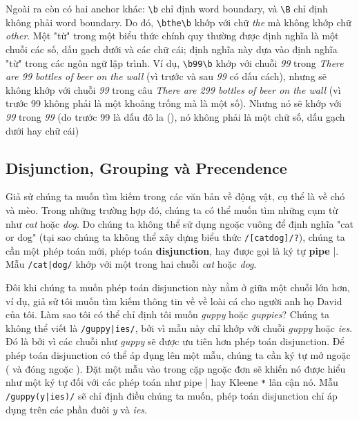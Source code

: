 Ngoài ra còn có hai anchor khác: \verb|\b| chỉ định word boundary, và \verb|\B| chỉ định không phải word boundary. Do đó, \verb|\bthe\b| khớp với chữ \textit{the} mà không khớp chữ \textit{other}. Một "từ" trong một biểu thức chính quy thường được định nghĩa là một chuỗi các số, dấu gạch dưới và các chữ cái; định nghĩa này dựa vào định nghĩa "từ" trong các ngôn ngữ lập trình. Ví dụ, \verb|\b99\b| khớp với chuỗi \textit{99} trong \textit{There are 99 bottles of beer on the wall} (vì trước và sau \textit{99} có dấu cách), nhưng sẽ không khớp với chuỗi \textit{99} trong câu \textit{There are 299 bottles of beer on the wall} (vì trước 99 không phải là một khoảng trống mà là một số). Nhưng nó sẽ khớp với \textit{99} trong \textit{99} (do trước 99 là dấu đô la (), nó không phải là một chữ số, dấu gạch dưới hay chữ cái)

\subsection{Disjunction, Grouping và Precendence}

Giả sử chúng ta muốn tìm kiếm trong các văn bản về động vật, cụ thể là về chó và mèo. Trong những trường hợp đó, chúng ta có thể muốn tìm những cụm từ như \textit{cat} hoặc \textit{dog}. Do chúng ta không thể sử dụng ngoặc vuông để định nghĩa "cat or dog" (tại sao chúng ta không thể xây dựng biểu thức \verb|/[catdog]/?|), chúng ta cần một phép toán mới, phép toán \textbf{disjunction}, hay được gọi là ký tự \textbf{pipe} \verb|||. Mẫu \verb=/cat|dog/= khớp với một trong hai chuỗi \textit{cat} hoặc \textit{dog}.

Đôi khi chúng ta muốn phép toán disjunction này nằm ở giữa một chuỗi lớn hơn, ví dụ, giả sử tôi muốn tìm kiếm thông tin về về loài cá cho người anh họ David của tôi. Làm sao tôi có thể chỉ định tôi muốn \textit{guppy} hoặc \textit{guppies}? Chúng ta không thể viết là \texttt{/guppy|ies/}, bởi vì mẫu này chỉ khớp với chuỗi \textit{guppy} hoặc \textit{ies}. Đó là bởi vì các chuỗi như \textit{guppy} sẽ được ưu tiên hơn phép toán disjunction. Để phép toán disjunction có thể áp dụng lên một mẫu, chúng ta cần ký tự mở ngoặc ( và đóng ngoặc ). Đặt một mẫu vào trong cặp ngoặc đơn sẽ khiến nó được hiểu như một ký tự đối với các phép toán như pipe \verb||| hay Kleene \verb|*| lân cận nó. Mẫu \texttt{/guppy(y|ies)/} sẽ chỉ định điều chúng ta muốn, phép toán disjunction chỉ áp dụng trên các phần đuôi \textit{y} và \textit{ies}.

